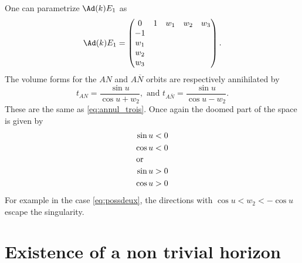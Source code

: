 One can parametrize $\Ad(k)E_1$ as
\begin{equation}
\Ad(k)E_1=
\begin{pmatrix}
0&1&w_1&w_2&w_3\\
-1\\
w_1\\
w_2\\
w_3
\end{pmatrix}.
\end{equation}
The volume forms for the $AN$ and $A \overline{N}$ orbits are respectively annihilated by
\begin{equation}
t_{AN}=\frac{\sin u}{\cos u+w_2}, \text{ and } t_{A \overline{N}}=\frac{\sin u}{\cos u-w_2}.
\end{equation}
These are the same as \eqref{eq:annul_trois}. Once again the doomed part of the space is given by
\begin{subequations}
\begin{align}
\begin{split}
\sin u<0\\
\cos u<0
\end{split}\\
\intertext{or}
\begin{split}  \label{eq:possdeux}
\sin u>0\\
\cos u>0
\end{split}
\end{align}
\end{subequations}
For example in the case \eqref{eq:possdeux}, the directions with $\cos u<w_2<-\cos u$ escape the singularity.
\section{Existence of a non trivial horizon}		\label{SecExistenceHor}

